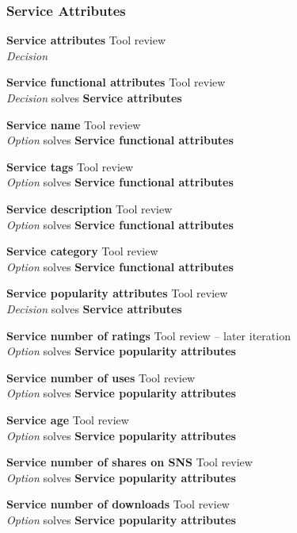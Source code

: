 \subsubsection{Service Attributes}

\textbf{Service attributes} \hfill Tool review \\ \emph{Decision} \hfill 

\textbf{Service functional attributes} \hfill Tool review \\ \emph{Decision} \hfill solves \textbf{Service attributes}

\textbf{Service name} \hfill Tool review \\ \emph{Option} \hfill solves \textbf{Service functional attributes}

\textbf{Service tags} \hfill Tool review \\ \emph{Option} \hfill solves \textbf{Service functional attributes}

\textbf{Service description} \hfill Tool review \\ \emph{Option} \hfill solves \textbf{Service functional attributes}

\textbf{Service category} \hfill Tool review \\ \emph{Option} \hfill solves \textbf{Service functional attributes}

\textbf{Service popularity attributes} \hfill Tool review \\ \emph{Decision} \hfill solves \textbf{Service attributes}

\textbf{Service number of ratings} \hfill Tool review  -- later iteration \\ \emph{Option} \hfill solves \textbf{Service popularity attributes}

\textbf{Service number of uses} \hfill Tool review \\ \emph{Option} \hfill solves \textbf{Service popularity attributes}

\textbf{Service age} \hfill Tool review \\ \emph{Option} \hfill solves \textbf{Service popularity attributes}

\textbf{Service number of shares on SNS} \hfill Tool review \\ \emph{Option} \hfill solves \textbf{Service popularity attributes}

\textbf{Service number of downloads} \hfill Tool review \\ \emph{Option} \hfill solves \textbf{Service popularity attributes}

